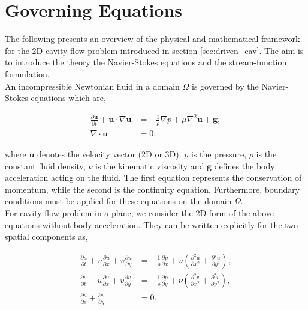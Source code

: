 
\section{Governing Equations} \label{sec:gov_equ}

The following presents an overview of the physical and mathematical framework
for the 2D cavity flow problem introduced in section \ref{sec:driven_cav}. The
aim is to introduce the theory the Navier-Stokes equations and the
stream-function formulation. \\

An incompressible Newtonian fluid in a domain $\Omega$ is governed by the
Navier-Stokes equations which are,

\begin{align}
\frac{\partial \mathbf{u}}{\partial t} + 
  \mathbf{u} \cdot \nabla \mathbf{u} &= 
  - \frac{1}{\rho} \nabla p + \mu \nabla^2 \mathbf{u} + \mathbf{g},
  \label{eq:ns3d} \\
\nabla \cdot \mathbf{u} &= 0 \label{eq:cont3d},
\end{align}

where $\mathbf{u}$ denotes the velocity vector (2D or 3D). $p$ is the pressure,
$\rho$ is the constant fluid density, $\nu$ is the kinematic viscosity and
$\mathbf{g}$ defines the body acceleration acting on the fluid. The first
equation represents the conservation of momentum, while the second is the
continuity equation. Furthermore, boundary conditions must be applied for these
equations on the domain $\Omega$. \\

For cavity flow problem in a plane, we consider the 2D form of the above
equations without body acceleration. They can be written explicitly for the two
spatial components as, 

\begin{align}
\frac{\partial u}{\partial t} + u \frac{\partial u}{\partial x} 
  + v \frac{\partial u}{\partial y} &= 
  - \frac{1}{\rho}\frac{\partial p}{\partial x}
  + \nu \left(\frac{\partial^2 u}{\partial x^2}
  + \frac{\partial^2 u}{\partial y^2}\right) \label{eq:ns2d-u}, \\
\frac{\partial v}{\partial t} + u \frac{\partial v}{\partial x}
  + v \frac{\partial v}{\partial y} &=
  - \frac{1}{\rho}\frac{\partial p}{\partial y} 
  + \nu \left(\frac{\partial^2 v}{\partial x^2}
  + \frac{\partial^2 v}{\partial y^2}\right) \label{eq:ns2d-v}, \\ 
\frac{\partial u}{\partial x}
  + \frac{\partial v}{\partial y} &= 0 \label{eq:cont2d}.
\end{align}

